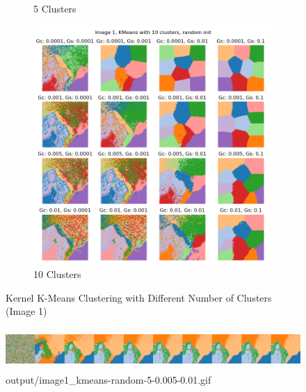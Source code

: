 \documentclass{homework}
\begin{document}
\begin{figure}[H]
\begin{subfigure}{0.32\textwidth}
        \caption{5 Clusters}
    \end{subfigure}
    \begin{subfigure}{0.32\textwidth}
        \centering
        \includegraphics[width=\textwidth]{output_grid/image1_kmeans-random-10.png}
        \caption{10 Clusters}
    \end{subfigure}
    \caption{Kernel K-Means Clustering with Different Number of Clusters (Image 1)}
\end{figure}

\begin{figure}[H]
    \centering
    \includegraphics[height=1.6cm]{output_flatgif/flatgif_image1_kmeans-random-5-0.005-0.01.png}
    \caption{output/image1\_kmeans-random-5-0.005-0.01.gif}
\end{figure}
\end{document}
